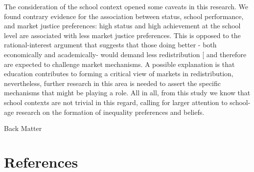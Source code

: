\documentclass[
  12pt,
  letterpaper,
]{article}
\begin{document}
The consideration of the school context opened some caveats in this
research. We found contrary evidence for the association between status,
school performance, and market justice preferences: high status and high
achievement at the school level are associated with less market justice
preferences. This is opposed to the rational-interest argument that
suggests that those doing better - both economically and academically-
would demand less redistribution
{[}\citeproc{ref-bullock_education_2021}{80}{]} and therefore are
expected to challenge market mechanisms. A possible explanation is that
education contributes to forming a critical view of markets in
redistribution, nevertheless, further research in this area is needed to
assert the specific mechanisms that might be playing a role. All in all,
from this study we know that school contexts are not trivial in this
regard, calling for larger attention to school-age research on the
formation of inequality preferences and beliefs.

\newpage{}

\begin{idetres}

Back Matter
\end{idetres}

\section*{References}\label{bibliography}
\end{document}
